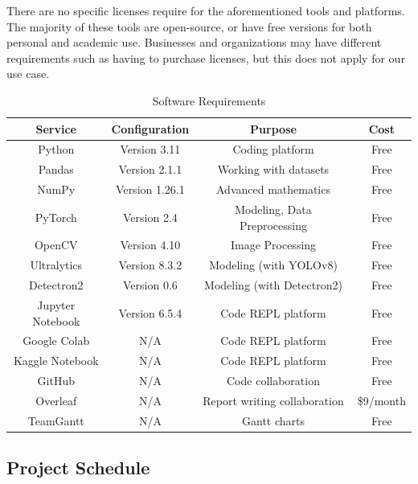 \documentclass[stu,12pt,floatsintext]{apa7}
\begin{document}
There are no specific licenses require for the aforementioned tools and platforms. The majority of these tools are open-source, or have free versions for both personal and academic use. Businesses and organizations may have different requirements such as having to purchase licenses, but this does not apply for our use case.

\begin{table}[!htb]
	\centering
	\caption{Software Requirements}
	\begin{tabular}{cccc}
		\hline
		Service          & Configuration  & Purpose                      & Cost      \\
		\hline
		Python           & Version 3.11   & Coding platform              & Free      \\
		Pandas           & Version 2.1.1  & Working with datasets        & Free      \\
		NumPy            & Version 1.26.1 & Advanced mathematics         & Free      \\
		PyTorch          & Version 2.4    & Modeling, Data Preprocessing & Free      \\
		OpenCV           & Version 4.10   & Image Processing             & Free      \\
		Ultralytics      & Version 8.3.2  & Modeling (with YOLOv8)       & Free      \\
		Detectron2       & Version 0.6    & Modeling (with Detectron2)   & Free      \\
		Jupyter Notebook & Version 6.5.4  & Code REPL platform           & Free      \\
		Google Colab     & N/A            & Code REPL platform           & Free      \\
		Kaggle Notebook  & N/A            & Code REPL platform           & Free      \\
		GitHub           & N/A            & Code collaboration           & Free      \\
		Overleaf         & N/A            & Report writing collaboration & \$9/month \\
		TeamGantt        & N/A            & Gantt charts                 & Free      \\
		\hline
	\end{tabular}
	\label{tab:software}
\end{table}

\subsection{Project Schedule}
\end{document}
